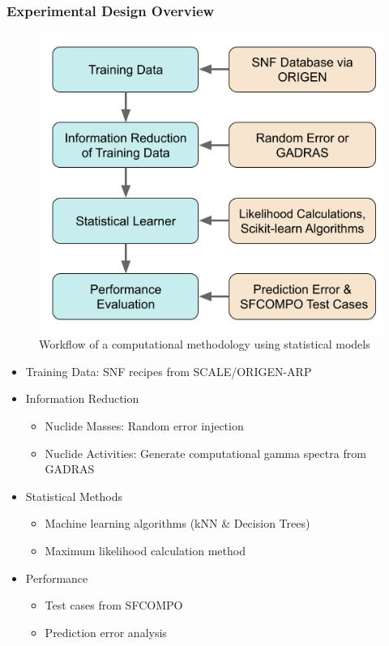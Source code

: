 \begin{frame}
  \frametitle{Experimental Design Overview}
  \begin{minipage}{0.45\textwidth}
    \begin{figure}
      \centering
      \includegraphics[height=0.5\textheight]{./figures/methodology.png}
      \caption{Workflow of a computational methodology using statistical models}
    \end{figure}
  \end{minipage}%
  \begin{minipage}{0.55\textwidth}
    \begin{itemize}
      \item Training Data: SNF recipes from SCALE/ORIGEN-ARP \cite{scale, origen}
      \item Information Reduction
        \begin{itemize}
          \item Nuclide Masses: Random error injection
          \item Nuclide Activities: Generate computational gamma spectra from GADRAS \cite{gadras}
        \end{itemize}
      \item Statistical Methods
        \begin{itemize}
          \item Machine learning algorithms (kNN \& Decision Trees) \cite{scikit}
          \item Maximum likelihood calculation method \cite{mll_method, mll_sensitivity}
        \end{itemize}
      \item Performance
        \begin{itemize}
          \item Test cases from SFCOMPO \cite{sfcompo}
          \item Prediction error analysis
        \end{itemize}
    \end{itemize}
  \end{minipage}
\end{frame}

